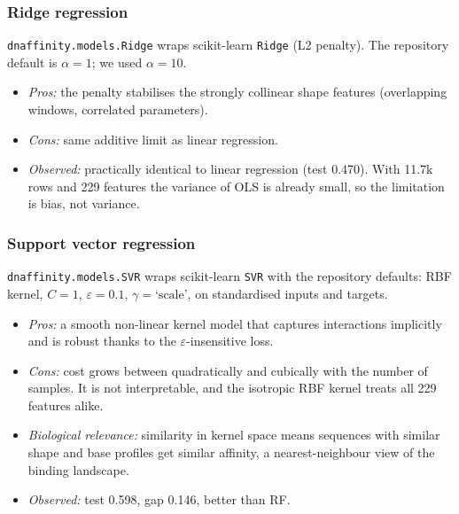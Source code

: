 \subsubsection{Ridge regression}
\texttt{dnaffinity.models.Ridge} wraps scikit-learn \texttt{Ridge} (L2 penalty). The repository default is $\alpha=1$; we used $\alpha=10$.
\begin{itemize}
\item \emph{Pros:} the penalty stabilises the strongly collinear shape features (overlapping windows, correlated parameters).
\item \emph{Cons:} same additive limit as linear regression.
\item \emph{Observed:} practically identical to linear regression (test 0.470). With 11.7k rows and 229 features the variance of OLS is already small, so the limitation is bias, not variance.
\end{itemize}

\subsubsection{Support vector regression}
\texttt{dnaffinity.models.SVR} wraps scikit-learn \texttt{SVR} with the repository defaults: RBF kernel, $C=1$, $\varepsilon=0.1$, $\gamma=\text{`scale'}$, on standardised inputs and targets.
\begin{itemize}
\item \emph{Pros:} a smooth non-linear kernel model that captures interactions implicitly and is robust thanks to the $\varepsilon$-insensitive loss.
\item \emph{Cons:} cost grows between quadratically and cubically with the number of samples. It is not interpretable, and the isotropic RBF kernel treats all 229 features alike.
\item \emph{Biological relevance:} similarity in kernel space means sequences with similar shape and base profiles get similar affinity, a nearest-neighbour view of the binding landscape.
\item \emph{Observed:} test 0.598, gap 0.146, better than RF.
\end{itemize}

